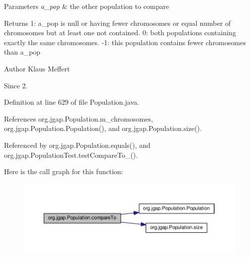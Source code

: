 \begin{DoxyParams}{Parameters}
{\em a\-\_\-pop} & the other population to compare \\
\hline
\end{DoxyParams}
\begin{DoxyReturn}{Returns}
1\-: a\-\_\-pop is null or having fewer chromosomes or equal number of chromosomes but at least one not contained. 0\-: both populations containing exactly the same chromosomes. -\/1\-: this population contains fewer chromosomes than a\-\_\-pop
\end{DoxyReturn}
\begin{DoxyAuthor}{Author}
Klaus Meffert 
\end{DoxyAuthor}
\begin{DoxySince}{Since}
2. 
\end{DoxySince}


Definition at line 629 of file Population.\-java.



References org.\-jgap.\-Population.\-m\-\_\-chromosomes, org.\-jgap.\-Population.\-Population(), and org.\-jgap.\-Population.\-size().



Referenced by org.\-jgap.\-Population.\-equals(), and org.\-jgap.\-Population\-Test.\-test\-Compare\-To\-\_().



Here is the call graph for this function\-:
\nopagebreak
\begin{figure}[H]
\begin{center}
\leavevmode
\includegraphics[width=350pt]{classorg_1_1jgap_1_1_population_a7671499966b4ffb937d45e373c6e95d9_cgraph}
\end{center}
\end{figure}


